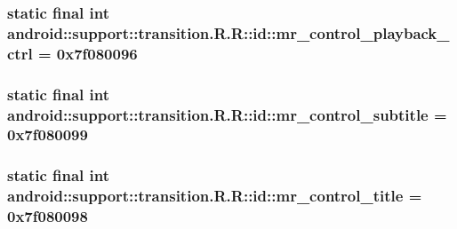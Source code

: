 \hypertarget{classandroid_1_1support_1_1transition_1_1_r_1_1id_a02309dc9276beee5ba1258640fd54e5}{
\subsubsection[{mr\_\-control\_\-playback\_\-ctrl}]{\setlength{\rightskip}{0pt plus 5cm}static final int android::support::transition.R.R::id::mr\_\-control\_\-playback\_\-ctrl = 0x7f080096}}
\label{classandroid_1_1support_1_1transition_1_1_r_1_1id_a02309dc9276beee5ba1258640fd54e5}


\hypertarget{classandroid_1_1support_1_1transition_1_1_r_1_1id_bb88044fd3e75024bd8d898103a66690}{
\subsubsection[{mr\_\-control\_\-subtitle}]{\setlength{\rightskip}{0pt plus 5cm}static final int android::support::transition.R.R::id::mr\_\-control\_\-subtitle = 0x7f080099}}
\label{classandroid_1_1support_1_1transition_1_1_r_1_1id_bb88044fd3e75024bd8d898103a66690}


\hypertarget{classandroid_1_1support_1_1transition_1_1_r_1_1id_5879d94f0b640e017ab868e1b418914c}{
\subsubsection[{mr\_\-control\_\-title}]{\setlength{\rightskip}{0pt plus 5cm}static final int android::support::transition.R.R::id::mr\_\-control\_\-title = 0x7f080098}}
\label{classandroid_1_1support_1_1transition_1_1_r_1_1id_5879d94f0b640e017ab868e1b418914c}


